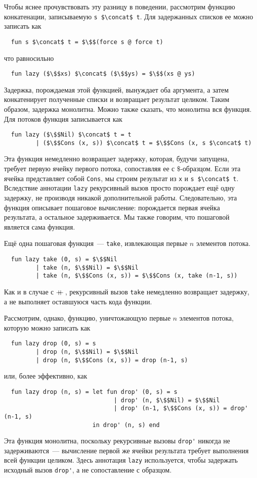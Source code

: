 Чтобы яснее прочувствовать эту разницу в поведении, рассмотрим функцию
конкатенации, записываемую \lstinline!s $\concat$ t!. Для задержанных
списков ее можно записать как
\begin{lstlisting}
  fun s $\concat$ t = $\$$(force s @ force t)
\end{lstlisting}
что равносильно
\begin{lstlisting}
  fun lazy ($\$$xs) $\concat$ ($\$$ys) = $\$$(xs @ ys)
\end{lstlisting}
Задержка, порождаемая этой функцией, вынуждает оба аргумента, а затем
конкатенирует полученные списки и возвращает результат целиком. Таким
образом, задержка монолитна. Можно также сказать, что монолитна вся
функция. Для потоков функция записывается как
\begin{lstlisting}
  fun lazy ($\$$Nil) $\concat$ t = t
         | ($\$$Cons (x, s)) $\concat$ t = $\$$Cons (x, s $\concat$ t)
\end{lstlisting}
Эта функция немедленно возвращает задержку, которая, будучи запущена,
требует первую ячейку первого потока, сопоставляя ее с
$\$$-образцом. Если эта ячейка представляет собой \lstinline!Cons!, мы
строим результат из \lstinline!x! и \lstinline!s $\concat$ t!. 
Вследствие аннотации \lstinline!lazy! рекурсивный вызов просто
порождает ещё одну задержку, не производя никакой дополнительной
работы. Следовательно, эта функция описывает пошаговое вычисление:
порождается первая ячейка результата, а остальное задерживается. Мы
также говорим, что пошаговой является сама функция.

Ещё одна пошаговая функция~--- \lstinline!take!, извлекающая первые
$n$ элементов потока.
\begin{lstlisting}
  fun lazy take (0, s) = $\$$Nil
         | take (n, $\$$Nil) = $\$$Nil
         | take (n, $\$$Cons (x, s)) = $\$$Cons (x, take (n-1, s))
\end{lstlisting}
Как и в случае с $+\!\!\!+\,$, рекурсивный вызов \lstinline!take!
немедленно возвращает задержку, а не выполняет оставшуюся часть кода
функции.

Рассмотрим, однако, функцию, уничтожающую первые $n$ элементов потока,
которую можно записать как
\begin{lstlisting}
  fun lazy drop (0, s) = s
         | drop (n, $\$$Nil) = $\$$Nil
         | drop (n, $\$$Cons (x, s)) = drop (n-1, s)
\end{lstlisting}
или, более эффективно, как
\begin{lstlisting}
  fun lazy drop (n, s) = let fun drop' (0, s) = s
                               | drop' (n, $\$$Nil) = $\$$Nil
                               | drop' (n-1, $\$$Cons (x, s)) = drop' (n-1, s)
                         in drop' (n, s) end
\end{lstlisting}
Эта функция монолитна, поскольку рекурсивные вызовы \lstinline!drop'!
никогда не задерживаются~--- вычисление первой же ячейки результата
требует выполнения всей функции целиком. Здесь аннотация
\lstinline!lazy! используется, чтобы задержать исходный вызов
\lstinline!drop'!, а не сопоставление с образцом.

